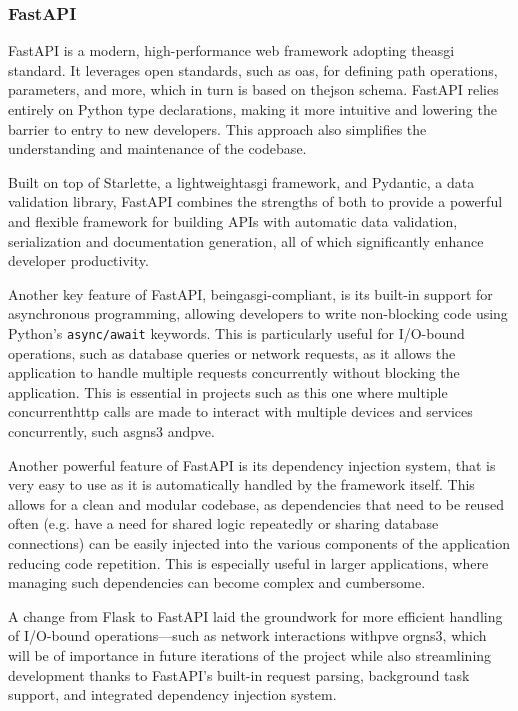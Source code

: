     \subsubsection{FastAPI}
      
      FastAPI is a modern, high-performance web framework adopting the\ac{asgi} standard. It leverages open standards, such as 
      \ac{oas}, for defining path operations, parameters, and more, which in turn is based on the\ac{json} schema.
      FastAPI relies entirely on Python type declarations, making it more intuitive and lowering the barrier to entry to new 
      developers. This approach also simplifies the understanding and maintenance of the codebase.
      
      Built on top of Starlette, a lightweight\ac{asgi} framework, and Pydantic, a data validation library, FastAPI combines the 
      strengths of both to provide a powerful and flexible framework for building APIs with automatic data validation, 
      serialization and documentation generation, all of which significantly enhance developer productivity.
      
      Another key feature of FastAPI, being\ac{asgi}-compliant, is its built-in support for asynchronous programming, allowing 
      developers to write non-blocking code using Python's \texttt{async/await} keywords. This is particularly useful 
      for I/O-bound operations, such as database queries or network requests, as it allows the application to handle multiple 
      requests concurrently without blocking the application. This is essential in projects such as this one where multiple 
      concurrent\ac{http} calls are made to interact with multiple devices and services concurrently, such as\ac{gns3} and\ac{pve}.
      
      Another powerful feature of FastAPI is its dependency injection system, that is very easy to use as it is automatically
      handled by the framework itself. This allows for a clean and modular codebase, as dependencies that need to be reused often
      (e.g. have a need for shared logic repeatedly or sharing database connections) can be easily injected into the various components 
      of the application reducing code repetition. This is especially useful in larger applications, where managing such dependencies can 
      become complex and cumbersome.
      
      A change from Flask to FastAPI laid the groundwork for more efficient handling of I/O-bound operations—such as network interactions 
      with\ac{pve} or\ac{gns3}, which will be of importance in future iterations of the project while also streamlining development thanks 
      to FastAPI's built-in request parsing, background task support, and integrated dependency injection system.

